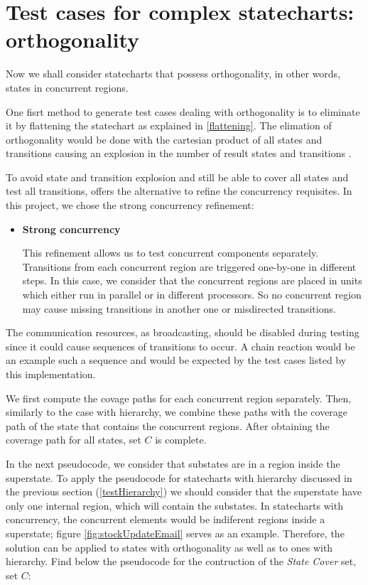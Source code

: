 \section{Test cases for complex statecharts: orthogonality}
\label{testOrthogonality}

Now we shall consider statecharts that possess orthogonality, in other words, states in concurrent regions.

One fisrt method to generate test cases dealing with orthogonality is to eliminate it by flattening the statechart as explained in \ref{flattening}. The elimation of orthogonality would be done with the cartesian product of all states and transitions causing an explosion in the number of result states and transitions \cite{bogdanov}.

To avoid state and transition explosion and still be able to cover all states and test all transitions, \cite{bogdanov} offers the alternative to refine the concurrency requisites. In this project, we chose the strong concurrency refinement:

\begin{itemize}

\item \textbf{Strong concurrency}

This refinement allows us to test concurrent components separately. Transitions from each concurrent region are triggered one-by-one in different steps. In this case, we consider that the concurrent regions are placed in units which either run in parallel or in different processors. So no concurrent region may cause missing transitions in another one or misdirected transitions.
\end{itemize}

The communication resources, as broadcasting, should be disabled during testing since it could cause sequences of transitions to occur. A chain reaction would be an example such a sequence and would be expected by the test cases listed by this implementation.

We first compute the covage paths for each concurrent region separately. Then, similarly to the case with hierarchy, we combine these paths with the coverage path of the state that contains the concurrent regions. After obtaining the coverage path for all states, set $C$ is complete. 

In the next pseudocode, we consider that substates are in a region inside the superstate. To apply the pseudocode for statecharts with hierarchy discussed in the previous section (\ref{testHierarchy}) we should consider that the superstate have only one internal region, which will contain the substates. In statecharts with concurrency, the concurrent elements would be indiferent regions inside a superstate; figure \ref{fig:stockUpdateEmail} serves as an example. Therefore, the solution can be applied to states with orthogonality as well as to ones with hierarchy. Find below the pseudocode for the contruction of the \textit{State Cover} set, set $C$:

